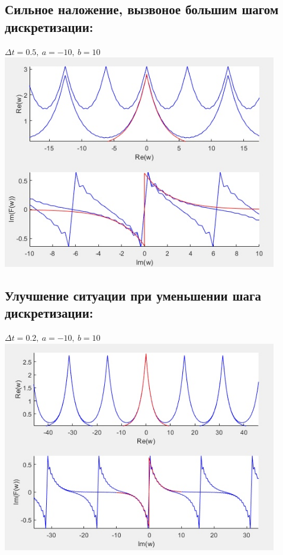 \documentclass{article}
\begin{document}
{\large\subsection{Сильное наложение, вызвоное большим шагом дискретизации:}}
\begin{center}
  $\Delta t = 0.5,\ a = -10,\ b = 10$
  \includegraphics[width = 12cm, height 12cm]{spectre2_1.jpg}
\end{center}

{\large\subsection{Улучшение ситуации при уменьшении шага дискретизации:}}
\begin{center}
  $\Delta t = 0.2,\ a = -10,\ b = 10$
  \includegraphics[width = 12cm, height 12cm]{spectre2_2.jpg}
\end{center}
\end{document}
